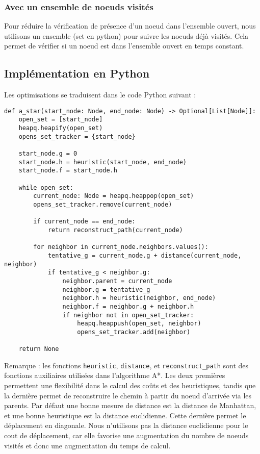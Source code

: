 \subsubsection*{Avec un ensemble de noeuds visités}
Pour réduire la vérification de présence d'un noeud dans l'ensemble ouvert, nous utilisons un ensemble (set en python) pour suivre les noeuds déjà visités. Cela permet de vérifier si un noeud est dans l'ensemble ouvert en temps constant.

\subsection{Implémentation en Python}
Les optimisations se traduisent dans le code Python suivant :

\begin{verbatim}
def a_star(start_node: Node, end_node: Node) -> Optional[List[Node]]:
    open_set = [start_node]
    heapq.heapify(open_set)
    opens_set_tracker = {start_node}

    start_node.g = 0
    start_node.h = heuristic(start_node, end_node)
    start_node.f = start_node.h

    while open_set:
        current_node: Node = heapq.heappop(open_set)
        opens_set_tracker.remove(current_node)

        if current_node == end_node:
            return reconstruct_path(current_node)

        for neighbor in current_node.neighbors.values():
            tentative_g = current_node.g + distance(current_node, neighbor)
            if tentative_g < neighbor.g:
                neighbor.parent = current_node
                neighbor.g = tentative_g
                neighbor.h = heuristic(neighbor, end_node)
                neighbor.f = neighbor.g + neighbor.h
                if neighbor not in open_set_tracker:
                    heapq.heappush(open_set, neighbor)
                    opens_set_tracker.add(neighbor)

    return None
\end{verbatim}

Remarque : les fonctions \texttt{heuristic}, \texttt{distance}, et \texttt{reconstruct\_path} sont des fonctions auxiliaires utilisées dans l'algorithme A*. Les deux premières permettent une flexibilité dans le calcul des coûts et des heuristiques, tandis que la dernière permet de reconstruire le chemin à partir du noeud d'arrivée via les parents. Par défaut une bonne mesure de distance est la distance de Manhattan, et une bonne heuristique est la distance euclidienne. Cette dernière permet le déplacement en diagonale. Nous n'utilisons pas la distance euclidienne pour le cout de déplacement, car elle favorise une augmentation du nombre de noeuds visités et donc une augmentation du temps de calcul.

